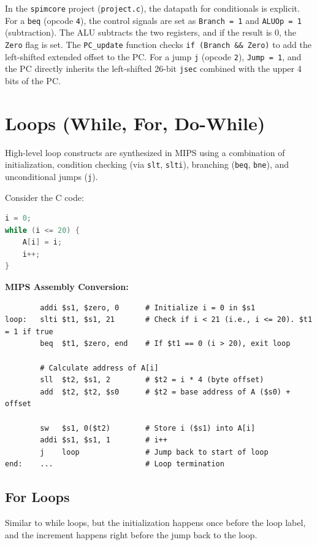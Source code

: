 \begin{remark}
In the \texttt{spimcore} project (\texttt{project.c}), the datapath for conditionals is explicit. For a \texttt{beq} (opcode \texttt{4}), the control signals are set as \texttt{Branch = 1} and \texttt{ALUOp = 1} (subtraction). The ALU subtracts the two registers, and if the result is 0, the \texttt{Zero} flag is set. The \texttt{PC\_update} function checks \texttt{if (Branch \&\& Zero)} to add the left-shifted extended offset to the PC. For a jump \texttt{j} (opcode \texttt{2}), \texttt{Jump = 1}, and the PC directly inherits the left-shifted 26-bit \texttt{jsec} combined with the upper 4 bits of the PC.
\end{remark}

\section{Loops (While, For, Do-While)}

High-level loop constructs are synthesized in MIPS using a combination of initialization, condition checking (via \texttt{slt}, \texttt{slti}), branching (\texttt{beq}, \texttt{bne}), and unconditional jumps (\texttt{j}).

\begin{example}
Consider the C code:
\begin{lstlisting}[language=C]
i = 0;
while (i <= 20) {
    A[i] = i;
    i++;
}
\end{lstlisting}

\textbf{MIPS Assembly Conversion:}
\begin{lstlisting}
        addi $s1, $zero, 0      # Initialize i = 0 in $s1
loop:   slti $t1, $s1, 21       # Check if i < 21 (i.e., i <= 20). $t1 = 1 if true
        beq  $t1, $zero, end    # If $t1 == 0 (i > 20), exit loop
        
        # Calculate address of A[i]
        sll  $t2, $s1, 2        # $t2 = i * 4 (byte offset)
        add  $t2, $t2, $s0      # $t2 = base address of A ($s0) + offset
        
        sw   $s1, 0($t2)        # Store i ($s1) into A[i]
        addi $s1, $s1, 1        # i++
        j    loop               # Jump back to start of loop
end:    ...                     # Loop termination
\end{lstlisting}
\end{example}

\subsection{For Loops}
Similar to while loops, but the initialization happens once before the loop label, and the increment happens right before the jump back to the loop.

